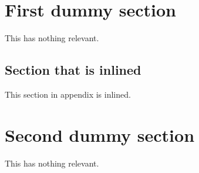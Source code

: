 \documentclass{article}
\begin{document}
\section{First dummy section}
This has nothing relevant.

\begin{toappendix}
  \section{Section that is inlined}
  This section in appendix is inlined.
\end{toappendix}

\section{Second dummy section}
This has nothing relevant.

\begin{toappendix}
  
\end{toappendix}
\end{document}
